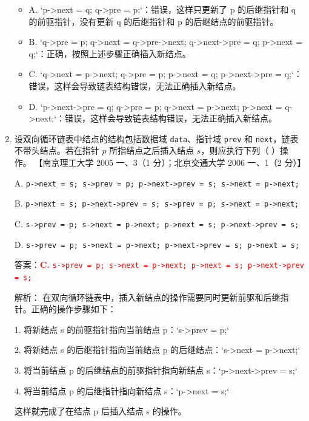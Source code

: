\documentclass[lang=cn,newtx,10pt,scheme=chinese]{../../../elegantbook}
\begin{document}
\begin{enumerate}
        \begin{itemize}
            \item A. `p->next = q; q->pre = p;`：错误，这样只更新了 p 的后继指针和 q 的前驱指针，没有更新 q 的后继指针和 p 的后继结点的前驱指针。
            \item B. `q->pre = p; q->next = q->pre->next; q->next->pre = q; p->next = q;`：正确，按照上述步骤正确插入新结点。
            \item C. `q->next = p->next; q->pre = p; p->next = q; p->next->pre = q;`：错误，这样会导致链表结构错误，无法正确插入新结点。
            \item D. `p->next->pre = q; q->pre = p; q->next = p->next; p->next = q->next;`：错误，这样会导致链表结构错误，无法正确插入新结点。
        \end{itemize}
    
        \item 设双向循环链表中结点的结构包括数据域 \texttt{data}、指针域 \texttt{prev} 和 \texttt{next}，链表不带头结点。若在指针 $p$ 所指结点之后插入结点 $s$，则应执行下列（ ）操作。  
        【南京理工大学 2005 一、3（1 分）；北京交通大学 2006 一、1（2 分）】 
    
        A. \texttt{p->next = s; s->prev = p; p->next->prev = s; s->next = p->next;} 
    
        B. \texttt{p->next = s; p->next->prev = s; s->prev = p; s->next = p->next;} 
    
        C. \texttt{s->prev = p; s->next = p->next; p->next = s; p->next->prev = s;}  
    
        D. \texttt{s->prev = p; s->next = p->next; p->next->prev = s; p->next = s;}  

        答案：\textcolor{red}{\textbf{C.} \texttt{s->prev = p; s->next = p->next; p->next = s; p->next->prev = s;}}

        解析：
        在双向循环链表中，插入新结点的操作需要同时更新前驱和后继指针。正确的操作步骤如下：

        1. 将新结点 s 的前驱指针指向当前结点 p：`s->prev = p;`

        2. 将新结点 s 的后继指针指向当前结点 p 的后继结点：`s->next = p->next;`

        3. 将当前结点 p 的后继结点的前驱指针指向新结点 s：`p->next->prev = s;`

        4. 将当前结点 p 的后继指针指向新结点 s：`p->next = s;`

        这样就完成了在结点 p 后插入结点 s 的操作。


\end{enumerate}
\end{document}
